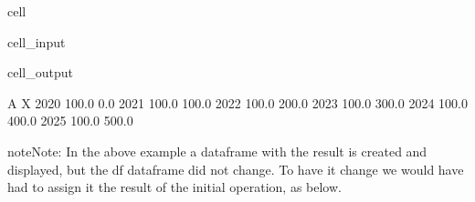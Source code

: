 \documentclass[letterpaper,10pt,english]{jupyterBook}
\begin{document}
\begin{sphinxuseclass}{cell}\begin{sphinxVerbatimInput}

\begin{sphinxuseclass}{cell_input}
\begin{sphinxVerbatim}[commandchars=\\\{\}]
\end{sphinxVerbatim}

\end{sphinxuseclass}\end{sphinxVerbatimInput}
\begin{sphinxVerbatimOutput}

\begin{sphinxuseclass}{cell_output}
\begin{sphinxVerbatim}[commandchars=\\\{\}]
          A      X
2020  100.0    0.0
2021  100.0  100.0
2022  100.0  200.0
2023  100.0  300.0
2024  100.0  400.0
2025  100.0  500.0
\end{sphinxVerbatim}

\end{sphinxuseclass}\end{sphinxVerbatimOutput}

\end{sphinxuseclass}
\begin{sphinxadmonition}{note}{Note:}
\sphinxAtStartPar
In the above example a  dataframe with the result is created and displayed, but the df dataframe did not change.  To have it change we would have had to assign it the result of the initial operation, as below.
\end{sphinxadmonition}
\end{document}
